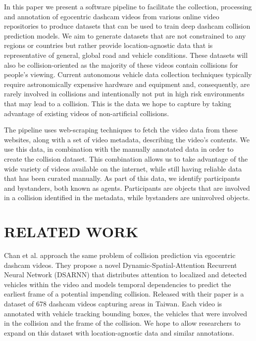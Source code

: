 \documentclass[letterpaper, 10 pt, conference]{IEEEconf}
\begin{document}
In this paper we present a software pipeline to facilitate the collection, processing and annotation of egocentric dashcam videos from various online video repositories to produce datasets that can be used to train deep dashcam collision prediction models.
We aim to generate datasets that are not constrained to any regions or countries but rather provide location-agnostic data that is representative of general, global road and vehicle conditions.
These datasets will also be collision-oriented as the majority of these videos contain collisions for people's viewing.
Current autonomous vehicle data collection techniques typically require astronomically expensive hardware and equipment and, consequently, are rarely involved in collisions and intentionally not put in high risk environments that may lead to a collision.
This is the data we hope to capture by taking advantage of existing videos of non-artificial collisions.

The pipeline uses web-scraping techniques to fetch the video data from these websites, along with a set of video metadata, describing the video's contents.
We use this data, in combination with the manually annotated data in order to create the collision dataset.
This combination allows us to take advantage of the wide variety of videos available on the internet, while still having reliable data that has been curated manually.
As part of this data, we identify participants and bystanders, both known as agents. Participants are objects that are involved in a collision identified in the metadata, while bystanders are uninvolved objects.

\section{RELATED WORK}

Chan et al. \cite{chan2016anticipating} approach the same problem of collision prediction via egocentric dashcam videos. They propose a novel Dynamic-Spatial-Attention Recurrent Neural Network (DSARNN) that distributes attention to localized and detected vehicles within the video and models temporal dependencies to predict the earliest frame of a potential impending collision. Released with their paper is a dataset of 678 dashcam videos capturing areas in Taiwan. Each video is annotated with vehicle tracking bounding boxes, the vehicles that were involved in the collision and the frame of the collision. We hope to allow researchers to expand on this dataset with location-agnostic data and similar annotations.
\end{document}
